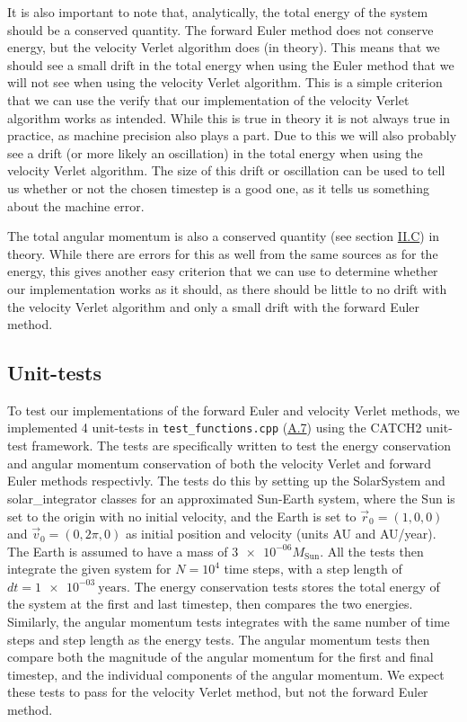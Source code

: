 \documentclass[reprint,english,notitlepage]{revtex4-1}  %
\begin{document}
It is also important to note that, analytically, the total energy of the system should be a conserved quantity. The forward Euler method does not conserve energy, but the velocity Verlet algorithm does (in theory). This means that we should see a small drift in the total energy when using the Euler method that we will not see when using the velocity Verlet algorithm. This is a simple criterion that we can use the verify that our implementation of the velocity Verlet algorithm works as intended. While this is true in theory it is not always true in practice, as machine precision also plays a part. Due to this we will also probably see a drift (or more likely an oscillation) in the total energy when using the velocity Verlet algorithm. The size of this drift or oscillation can be used to tell us whether or not the chosen timestep is a good one, as it tells us something about the machine error.

The total angular momentum is also a conserved quantity (see section \hyperref[sec:II:c]{II.C}) in theory. While there are errors for this as well from the same sources as for the energy, this gives another easy criterion that we can use to determine whether our implementation works as it should, as there should be little to no drift with the velocity Verlet algorithm and only a small drift with the forward Euler method.

\subsection{Unit-tests} \label{sec:III:d}
To test our implementations of the forward Euler and velocity Verlet methods, we implemented 4 unit-tests in \verb+test_functions.cpp+ (\hyperref[A.7]{A.7}) using the CATCH2 unit-test framework. The tests are specifically written to test the energy conservation and angular momentum conservation of both the velocity Verlet and forward Euler methods respectivly. The tests do this by setting up the SolarSystem and solar\_integrator classes for an approximated Sun-Earth system, where the Sun is set to the origin with no initial velocity, and the Earth is set to \(\vec{r}_{0} = (1, 0, 0)\) and \(\vec{v}_{0} = (0, 2\pi, 0)\) as initial position and velocity (units AU and AU/year). The Earth is assumed to have a mass of \(\num{3e-06}M_\text{Sun}\). All the tests then integrate the given system for \(N=10^4\) time steps, with a step length of \(dt = \SI{1e-03}{\text{years}}\). The energy conservation tests stores the total energy of the system at the first and last timestep, then compares the two energies. Similarly, the angular momentum tests integrates with the same number of time steps and step length as the energy tests. The angular momentum tests then compare both the magnitude of the angular momentum for the first and final timestep, and the individual components of the angular momentum. We expect these tests to pass for the velocity Verlet method, but not the forward Euler method.
\end{document}
